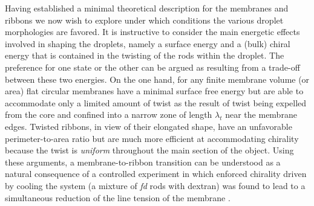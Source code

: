Having established a minimal theoretical description for the membranes and  ribbons we now wish to explore under which conditions the various droplet morphologies are favored. It is instructive to consider the main energetic effects involved in shaping the droplets, namely a surface energy and a (bulk) chiral energy that is contained in the twisting of the rods within the droplet. The preference for one state or the other can be argued as resulting from a trade-off between these two energies. On the one hand, for any finite membrane volume (or area) flat circular membranes have a minimal surface free energy but are able to accommodate only a limited amount of twist as the result of twist being expelled from the core and confined into a narrow zone of length $\lambda_{t}$ near the membrane edges. Twisted ribbons, in view of their elongated shape, have an unfavorable perimeter-to-area ratio but are much more efficient at accommodating chirality because the twist is {\em uniform} throughout the main section of the object. Using these arguments, a membrane-to-ribbon transition can  be understood as a natural consequence of a controlled experiment in which enforced chirality driven by cooling the system (a mixture of {\em fd} rods with dextran) was found to lead to a simultaneous reduction of the line tension of the membrane \cite{Gibaud2012}.

